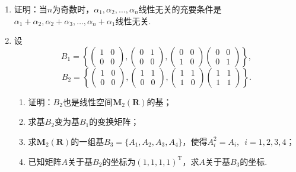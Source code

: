 \begin{enumerate}
    \item 证明：当$n$为奇数时，$\alpha_1,\alpha_2,\ldots,\alpha_n$线性无关的充要条件是$\alpha_1+\alpha_2,\alpha_2+\alpha_3,\ldots,\alpha_n+\alpha_1$线性无关.

    \item 设
          \[B_1=\left\{\begin{pmatrix}
                  1 & 0 \\ 0 & 0
              \end{pmatrix},\begin{pmatrix}
                  0 & 1 \\ 0 & 0
              \end{pmatrix},\begin{pmatrix}
                  0 & 0 \\ 1 & 0
              \end{pmatrix}\begin{pmatrix}
                  0 & 0 \\ 0 & 1
              \end{pmatrix}\right\},\]
          \[B_2=\left\{\begin{pmatrix}
                  1 & 0 \\ 0 & 0
              \end{pmatrix},\begin{pmatrix}
                  1 & 1 \\ 0 & 0
              \end{pmatrix},\begin{pmatrix}
                  1 & 1 \\ 1 & 0
              \end{pmatrix}\begin{pmatrix}
                  1 & 1 \\ 1 & 1
              \end{pmatrix}\right\}.\]
          \begin{enumerate}
              \item 证明：$B_2$也是线性空间$\mathbf{M}_2(\mathbf{R})$的基；

              \item 求基$B_2$变为基$B_1$的变换矩阵；

              \item 求$\mathbf{M}_2(\mathbf{R})$的一组基$B_3=\{A_1,A_2,A_3,A_4\}$，使得$A_i^2=A_i,\enspace i=1,2,3,4$；

              \item 已知矩阵$A$关于基$B_2$的坐标为$(1,1,1,1)^\mathrm{T}$，求$A$关于基$B_3$的坐标.
          \end{enumerate}


\end{enumerate}

